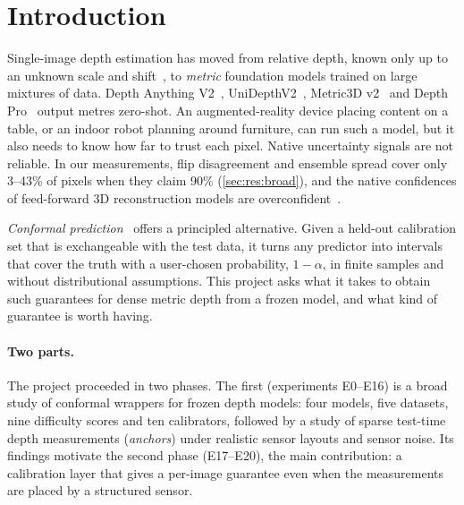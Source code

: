 \section{Introduction}
\label{sec:intro}

Single-image depth estimation has moved from relative depth, known only up to an unknown scale and shift~\cite{eigen2014depth,ranftl2022midas}, to \emph{metric} foundation models trained on large mixtures of data.
Depth Anything V2~\cite{yang2024dav2}, UniDepthV2~\cite{piccinelli2025unidepthv2}, Metric3D v2~\cite{hu2024metric3dv2} and Depth Pro~\cite{bochkovskii2025depthpro} output metres zero-shot.
An augmented-reality device placing content on a table, or an indoor robot planning around furniture, can run such a model, but it also needs to know how far to trust each pixel.
Native uncertainty signals are not reliable.
In our measurements, flip disagreement and ensemble spread cover only 3--43\% of pixels when they claim 90\% (\cref{sec:res:broad}), and the native confidences of feed-forward 3D reconstruction models are overconfident~\cite{deng2026calibrationaudit}.

\emph{Conformal prediction}~\cite{vovk2005alrw,lei2018distribution,angelopoulos2023gentle} offers a principled alternative.
Given a held-out calibration set that is exchangeable with the test data, it turns any predictor into intervals that cover the truth with a user-chosen probability, $1-\alpha$, in finite samples and without distributional assumptions.
This project asks what it takes to obtain such guarantees for dense metric depth from a frozen model, and what kind of guarantee is worth having.

\paragraph{Two parts.}
The project proceeded in two phases.
The first (experiments E0--E16) is a broad study of conformal wrappers for frozen depth models: four models, five datasets, nine difficulty scores and ten calibrators, followed by a study of sparse test-time depth measurements (\emph{anchors}) under realistic sensor layouts and sensor noise.
Its findings motivate the second phase (E17--E20), the main contribution: a calibration layer that gives a per-image guarantee even when the measurements are placed by a structured sensor.

